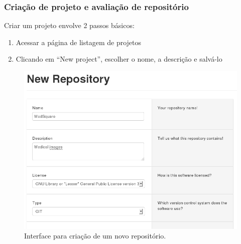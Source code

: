 \documentclass[12pt]{article}
\begin{document}
    \subsubsection{Criação de projeto e avaliação de repositório}
    Criar um projeto envolve 2 passos básicos:
    \begin{enumerate}
      \item Acessar a página de listagem de projetos
      \item Clicando em ``New project'', escolher o nome, a descrição e salvá-lo
    \end{enumerate}
    \begin{figure}[H]
      \centering
      \includegraphics[scale=0.50]{images/new-repository.png}
      \caption{Interface para criação de um novo repositório.}
      \label{fig:choose-metric}
    \end{figure}
\end{document}
